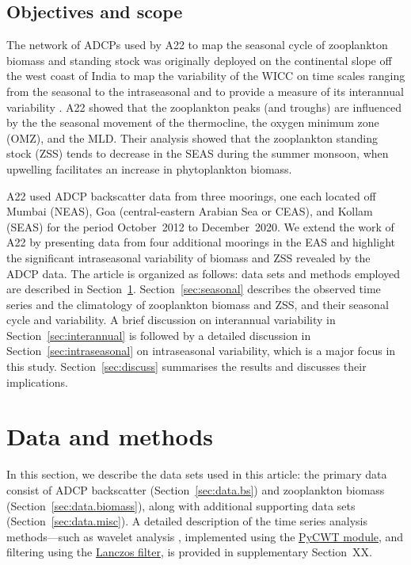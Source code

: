 \documentclass[authoryear,review,11pt]{elsarticle}
\begin{document}
\subsection{Objectives and scope}
\label{sec:intro.scope}

The network of ADCPs used by A22 to map the seasonal cycle of zooplankton biomass and standing stock was originally deployed on the continental slope off the west coast of India to map the variability of the WICC on time scales ranging from the seasonal to the intraseasonal and to provide a measure of its interannual variability \citep{amol2014observed, chaudhuri2020observed}. A22 showed that the zooplankton peaks (and troughs) are influenced by the the seasonal movement of the thermocline, the oxygen minimum zone (OMZ), and the MLD. Their analysis showed that the zooplankton standing stock (ZSS) tends to decrease in the SEAS during the summer monsoon, when upwelling facilitates an increase in phytoplankton biomass.

A22 used ADCP backscatter data from three moorings, one each located off Mumbai (NEAS), Goa (central-eastern Arabian Sea or CEAS), and Kollam (SEAS) for the period October~2012 to December~2020.  We extend the work of A22 by presenting data from four additional moorings in the EAS and highlight the significant intraseasonal variability of biomass and ZSS revealed by the ADCP data. The article is organized as follows: data sets and methods employed are described in Section~\ref{sec:data}. Section~\ref{sec:seasonal} describes the observed time series and the climatology of zooplankton biomass and ZSS, and their seasonal cycle and variability. A brief discussion on interannual variability in Section~\ref{sec:interannual} is followed by a detailed discussion in Section~\ref{sec:intraseasonal} on intraseasonal variability, which is a major focus in this study. Section~\ref{sec:discuss} summarises the results and discusses their implications.


\section{Data and methods}
\label{sec:data}

In this section, we describe the data sets used in this article: the primary data consist of ADCP backscatter (Section~\ref{sec:data.bs}) and zooplankton biomass (Section~\ref{sec:data.biomass}), along with additional supporting data sets (Section~\ref{sec:data.misc}). A detailed description of the time series analysis methods—such as wavelet analysis \citep{torrence1998practical,maraun2004cross}, implemented using the \href{https://pycwt.readthedocs.io/en/latest/}{PyCWT module}, and filtering using the \href{https://ferret.pmel.noaa.gov/Ferret/documentation/users-guide/appendix-a-external-functions/LANCZOS}{Lanczos filter}, is provided in supplementary Section~XX.
\end{document}

